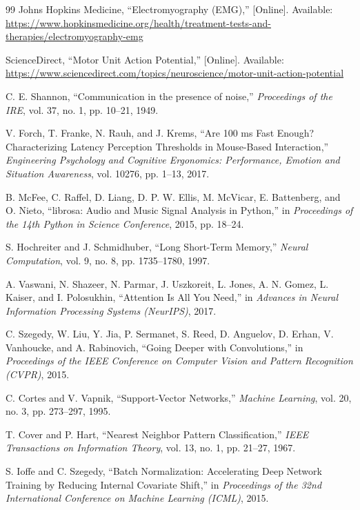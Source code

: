 \documentclass{article}
\begin{document}
\begin{thebibliography}{99}
Johns Hopkins Medicine,
``Electromyography (EMG),''
[Online]. Available: \url{https://www.hopkinsmedicine.org/health/treatment-tests-and-therapies/electromyography-emg}

ScienceDirect,
``Motor Unit Action Potential,''
[Online]. Available: \url{https://www.sciencedirect.com/topics/neuroscience/motor-unit-action-potential}

C. E. Shannon,
``Communication in the presence of noise,''
\textit{Proceedings of the IRE}, vol. 37, no. 1, pp. 10–21, 1949.

V. Forch, T. Franke, N. Rauh, and J. Krems,
``Are 100 ms Fast Enough? Characterizing Latency Perception Thresholds in Mouse-Based Interaction,''
\textit{Engineering Psychology and Cognitive Ergonomics: Performance, Emotion and Situation Awareness},
vol. 10276, pp. 1--13, 2017.

B. McFee, C. Raffel, D. Liang, D. P. W. Ellis, M. McVicar, E. Battenberg, and O. Nieto,
``librosa: Audio and Music Signal Analysis in Python,''
in \textit{Proceedings of the 14th Python in Science Conference}, 2015, pp. 18--24.

S. Hochreiter and J. Schmidhuber,
``Long Short-Term Memory,''
\textit{Neural Computation}, vol. 9, no. 8, pp. 1735--1780, 1997.

A. Vaswani, N. Shazeer, N. Parmar, J. Uszkoreit, L. Jones, A. N. Gomez, L. Kaiser, and I. Polosukhin,
``Attention Is All You Need,''
in \textit{Advances in Neural Information Processing Systems (NeurIPS)}, 2017.

C. Szegedy, W. Liu, Y. Jia, P. Sermanet, S. Reed, D. Anguelov, D. Erhan, V. Vanhoucke, and A. Rabinovich,
``Going Deeper with Convolutions,''
in \textit{Proceedings of the IEEE Conference on Computer Vision and Pattern Recognition (CVPR)}, 2015.

C. Cortes and V. Vapnik,
``Support-Vector Networks,''
\textit{Machine Learning}, vol. 20, no. 3, pp. 273--297, 1995.

T. Cover and P. Hart,
``Nearest Neighbor Pattern Classification,''
\textit{IEEE Transactions on Information Theory}, vol. 13, no. 1, pp. 21--27, 1967.

S. Ioffe and C. Szegedy,
``Batch Normalization: Accelerating Deep Network Training by Reducing Internal Covariate Shift,''
in \textit{Proceedings of the 32nd International Conference on Machine Learning (ICML)}, 2015.


\end{thebibliography}
\end{document}
